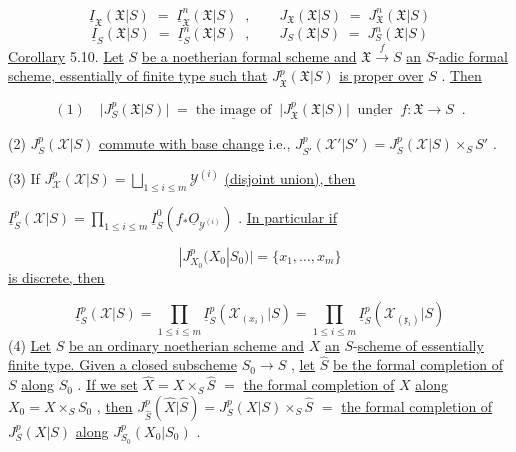 \begin{equation*}
\underline{I}_{\mathfrak{X}}(\mathfrak{X}|S) \;=\; \underline{I}^{n}_{\mathfrak{X}}(\mathfrak{X}|S) \;\;,\qquad J_{\mathfrak{X}}(\mathfrak{X}|S) \;=\; J^{n}_{\mathfrak{X}}(\mathfrak{X}|S)
\end{equation*}
\begin{equation*}
\underline{I}_{S}(\mathfrak{X}|S) \;=\; \underline{I}^{n}_{S}(\mathfrak{X}|S) \;\;,\qquad J_{S}(\mathfrak{X}|S) \;=\; J^{n}_{S}(\mathfrak{X}|S)
\end{equation*}
\underline{Corollary} 5.10. \underline{Let} $S$ \underline{be a noetherian formal scheme and} $\mathfrak{X} \xrightarrow{\,f\,} S$ \underline{an} $S$-\underline{adic formal scheme, essentially of finite type such that} $J^{p}_{\mathfrak{X}}(\mathfrak{X}|S)$ \underline{is proper over} $S$ . \underline{Then}

\begin{equation*}
(1)\quad \big|J^{p}_{S}(\mathfrak{X}|S)\big| \;=\; \underline{\text{the image of}} \;\; \big|J^{p}_{\mathfrak{X}}(\mathfrak{X}|S)\big| \;\; \underline{\text{under}} \;\; f : \mathfrak{X} \to S \;\;.
\end{equation*}


(2)  $J^p_S(\mathcal{X}|S)$  \underline{commute with base change}  i.e.,  $J^p_{S'}(\mathcal{X}'|S') = J^p_S(\mathcal{X}|S) \times_S S'$  .

(3)  If  $J^p_{\mathcal{X}}(\mathcal{X}|S) = \bigsqcup_{1\leq i\leq m} \mathcal{Y}^{(i)}$  \underline{(disjoint union), then}

$\underline{I}^p_S(\mathcal{X}|S) = \prod_{1\leq i\leq m} \underline{I}^0_S(f_*\underline{O}_{\mathcal{Y}^{(i)}})$  . \underline{In particular if}

\begin{equation*}
|J^p_{X_0}(X_0|S_0)| = \{x_1,\ldots,x_m\}
\end{equation*}
\underline{is discrete, then}

\begin{equation*}
\underline{I}^p_S(\mathcal{X}|S) = \prod_{1\leq i\leq m} \underline{I}^p_S(\mathcal{X}_{(x_i)}|S) = \prod_{1\leq i\leq m} \underline{I}^p_S(\mathcal{X}_{(\mathfrak{x}_i)}|S)
\end{equation*}
(4)  \underline{Let}  $S$  \underline{be an ordinary noetherian scheme and}  $X$  \underline{an} $S$-\underline{scheme of essentially finite type. Given a closed subscheme}  $S_0 \to S$  , \underline{let}  $\hat{S}$  \underline{be the formal completion of}  $S$  \underline{along}  $S_0$  . \underline{If we set}  $\hat{X} = X \times_S \hat{S}$ $=$ \underline{the formal completion of}  $X$  \underline{along}  $X_0 = X \times_S S_0$  , \underline{then}  $J^p_{\hat{S}}(\hat{X}|\hat{S}) = J^p_S(X|S) \times_S \hat{S}$ $=$ \underline{the formal completion of}  $J^p_S(X|S)$  \underline{along}  $J^p_{S_0}(X_0|S_0)$  .

